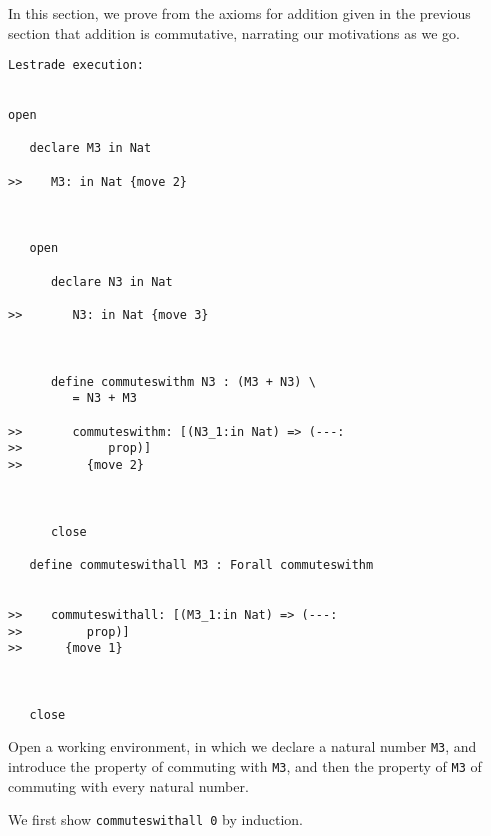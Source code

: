 \documentclass[12pt]{article}
\begin{document}
In this section, we prove from the axioms for addition given in the previous section that addition is commutative, narrating our motivations
as we go.

\begin{verbatim}Lestrade execution:


open

   declare M3 in Nat

>>    M3: in Nat {move 2}



   open

      declare N3 in Nat

>>       N3: in Nat {move 3}



      define commuteswithm N3 : (M3 + N3) \
         = N3 + M3

>>       commuteswithm: [(N3_1:in Nat) => (---:
>>            prop)]
>>         {move 2}



      close

   define commuteswithall M3 : Forall commuteswithm


>>    commuteswithall: [(M3_1:in Nat) => (---:
>>         prop)]
>>      {move 1}



   close
\end{verbatim}

Open a working environment, in which we declare a natural number {\tt M3}, and introduce the property of commuting with {\tt M3}, and then the property of {\tt M3} of commuting with every natural number.

We first show {\tt commuteswithall 0} by induction.
\end{document}
